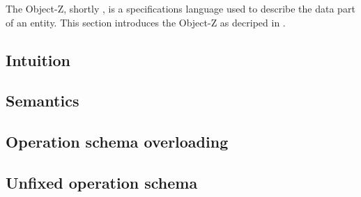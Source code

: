 The Object-Z, shortly \oz{}, is a specifications language used to describe the data part of an entity. This section introduces the Object-Z as decriped in \cite{olderog}.
\subsection{Intuition}
\label{sec_oz_intuition}


\subsection{Semantics}
\label{sec_oz_sem}


\subsection{Operation schema overloading}
\label{overloaded_operation}


\subsection{Unfixed operation schema}
\label{unfixed_operation}
